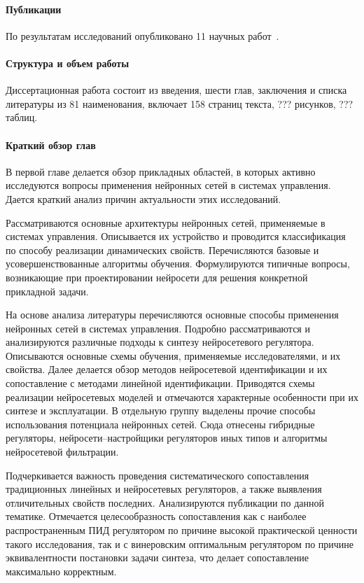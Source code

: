 \paragraph{Публикации}
По результатам исследований опубликовано 11 научных
работ~\cite{elfil-pta99,
filelav-ict99,filel-ict2000,filel-ist2000,elfil-iwk2000,filel-ict2003,
el-neurocomp2002,elzenk-extrob2006,elfil-modctrl2006,filel-iwk2010,
elfil-vestmei2010}.

\paragraph{Структура и объем работы}
Диссертационная работа состоит из введения, шести глав, заключения и
списка литературы из 81 наименования, включает 158 страниц текста, ???
рисунков, ??? таблиц.

\paragraph{Краткий обзор глав}


В первой главе делается обзор прикладных областей, в которых активно
исследуются вопросы применения нейронных сетей в системах управления.
Дается краткий анализ причин актуальности этих исследований.

Рассматриваются основные архитектуры нейронных сетей, применяемые в
системах управления.  Описывается их устройство и проводится
классификация по способу реализации динамических свойств.
Перечисляются базовые и усовершенствованные алгоритмы обучения.
Формулируются типичные вопросы, возникающие при проектировании
нейросети для решения конкретной прикладной задачи.

На основе анализа литературы перечисляются основные способы применения
нейронных сетей в системах управления.  Подробно рассматриваются и
анализируются различные подходы к синтезу нейросетевого регулятора.
Описываются основные схемы обучения, применяемые исследователями, и их
свойства.  Далее делается обзор методов нейросетевой идентификации и
их сопоставление с методами линейной идентификации.  Приводятся схемы
реализации нейросетевых моделей и отмечаются характерные особенности
при их синтезе и эксплуатации.  В отдельную группу выделены прочие
способы использования потенциала нейронных сетей.  Сюда отнесены
гибридные регуляторы, нейросети--настройщики регуляторов иных типов и
алгоритмы нейросетевой фильтрации.

Подчеркивается важность проведения систематического сопоставления
традиционных линейных и нейросетевых регуляторов, а также выявления
отличительных свойств последних.  Анализируются публикации по данной
тематике.  Отмечается целесообразность сопоставления как с наиболее
распространенным ПИД регулятором по причине высокой практической
ценности такого исследования, так и с винеровским оптимальным
регулятором по причине эквивалентности постановки задачи синтеза, что
делает сопоставление максимально корректным.

